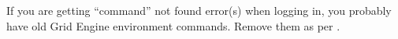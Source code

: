 



%

If you are getting ``command'' not found error(s) when logging in, you
probably have old Grid Engine environment commands. Remove them
as per .
